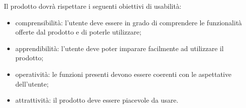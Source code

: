 Il prodotto dovrà rispettare i seguenti obiettivi di usabilità:

\begin{itemize}
    \item comprensibilità: l'utente deve essere in grado di comprendere le funzionalità offerte dal prodotto e di poterle utilizzare;
    \item apprendibilità: l'utente deve poter imparare facilmente ad utilizzare il prodotto;
    \item operatività: le funzioni presenti devono essere coerenti con le aspettative dell'utente;
    \item attrattività: il prodotto deve essere piacevole da usare.
\end{itemize}